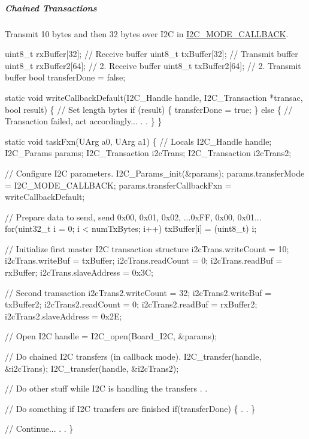 \subparagraph*{Chained Transactions}

Transmit 10 bytes and then 32 bytes over I2\+C in \hyperlink{_i2_c_8h_a39f3b9340fc4ee241b0d2da9b2841c26a129731a7edeb285f43a54b2cf9f5ac72}{I2\+C\+\_\+\+M\+O\+D\+E\+\_\+\+C\+A\+L\+L\+B\+A\+C\+K}. 
\begin{DoxyCode}
uint8\_t rxBuffer[32];            \textcolor{comment}{// Receive buffer}
uint8\_t txBuffer[32];            \textcolor{comment}{// Transmit buffer}
uint8\_t rxBuffer2[64];           \textcolor{comment}{// 2. Receive buffer}
uint8\_t txBuffer2[64];           \textcolor{comment}{// 2. Transmit buffer}
\textcolor{keywordtype}{bool} transferDone = \textcolor{keyword}{false};

\textcolor{keyword}{static} \textcolor{keywordtype}{void} writeCallbackDefault(I2C_Handle handle, I2C_Transaction *transac, \textcolor{keywordtype}{bool} result)
\{
    \textcolor{comment}{// Set length bytes}
    \textcolor{keywordflow}{if} (result) \{
        transferDone = \textcolor{keyword}{true};
    \} \textcolor{keywordflow}{else} \{
        \textcolor{comment}{// Transaction failed, act accordingly...}
        .
        .
    \}
\}

\textcolor{keyword}{static} \textcolor{keywordtype}{void} taskFxn(UArg a0, UArg a1)
\{
    \textcolor{comment}{// Locals}
    I2C_Handle handle;
    I2C_Params params;
    I2C_Transaction i2cTrans;
    I2C_Transaction i2cTrans2;

    \textcolor{comment}{// Configure I2C parameters.}
    I2C_Params_init(&params);
    params.transferMode = I2C_MODE_CALLBACK;
    params.transferCallbackFxn = writeCallbackDefault;

    \textcolor{comment}{// Prepare data to send, send 0x00, 0x01, 0x02, ...0xFF, 0x00, 0x01...}
    \textcolor{keywordflow}{for}(uint32\_t i = 0; i < numTxBytes; i++)
        txBuffer[i] = (uint8\_t) i;

    \textcolor{comment}{// Initialize first master I2C transaction structure}
    i2cTrans.writeCount   = 10;
    i2cTrans.writeBuf     = txBuffer;
    i2cTrans.readCount    = 0;
    i2cTrans.readBuf      = rxBuffer;
    i2cTrans.slaveAddress = 0x3C;

    \textcolor{comment}{// Second transaction}
    i2cTrans2.writeCount   = 32;
    i2cTrans2.writeBuf     = txBuffer2;
    i2cTrans2.readCount    = 0;
    i2cTrans2.readBuf      = rxBuffer2;
    i2cTrans2.slaveAddress = 0x2E;

    \textcolor{comment}{// Open I2C}
    handle = I2C_open(Board\_I2C, &params);

    \textcolor{comment}{// Do chained I2C transfers (in callback mode).}
    I2C_transfer(handle, &i2cTrans);
    I2C_transfer(handle, &i2cTrans2);

    \textcolor{comment}{// Do other stuff while I2C is handling the transfers}
    .
    .

    \textcolor{comment}{// Do something if I2C transfers are finished}
    \textcolor{keywordflow}{if}(transferDone) \{
        .
        .
    \}

    \textcolor{comment}{// Continue...}
    .
    .
\}
\end{DoxyCode}


